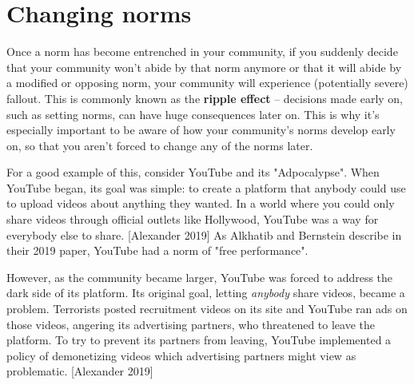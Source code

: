 \documentclass[class=book, crop=false]{standalone}
\providecommand{\keyterm}[1]{\textbf{#1}\marginnote{\scriptsize \textbf{#1}}}
\begin{document}
\section{Changing norms}

Once a norm has become entrenched in your community, if you suddenly decide that your community won't abide by that norm anymore or that it will abide by a modified or opposing norm, your community will experience (potentially severe) fallout. This is commonly known as the \keyterm{ripple effect} -- decisions made early on, such as setting norms, can have huge consequences later on. This is why it's especially important to be aware of how your community's norms develop early on, so that you aren't forced to change any of the norms later.

For a good example of this, consider YouTube and its "Adpocalypse". When YouTube began, its goal was simple: to create a platform that anybody could use to upload videos about anything they wanted. In a world where you could only share videos through official outlets like Hollywood, YouTube was a way for everybody else to share. [Alexander 2019] As Alkhatib and Bernstein describe in their 2019 paper, YouTube had a norm of "free performance".

However, as the community became larger, YouTube was forced to address the dark side of its platform. Its original goal, letting \textit{anybody} share videos, became a problem. Terrorists posted recruitment videos on its site and YouTube ran ads on those videos, angering its advertising partners, who threatened to leave the platform. To try to prevent its partners from leaving, YouTube implemented a policy of demonetizing videos which advertising partners might view as problematic. [Alexander 2019]
\end{document}
